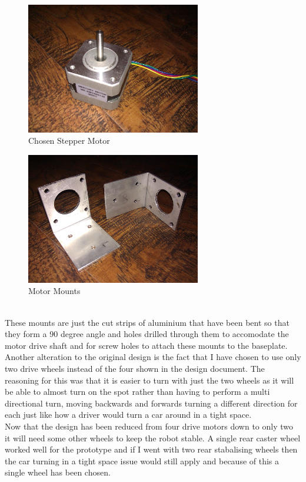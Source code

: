 \begin{figure}[h]
\centering
        \includegraphics[width=3.0in]  {Images/small-stepper.jpg}
        \caption{Chosen Stepper Motor}
        \label{Chosen Stepper Motor}
\end{figure}
\begin{figure}[h]
\centering
        \includegraphics[width=3.0in]  {Images/motor-mount-1.jpg}
        \caption{Motor Mounts}
        \label{Motor Mounts}
\end{figure}
\\These mounts are just the cut strips of aluminium that have been bent so that they form a 90 degree angle and holes drilled through them to accomodate the motor drive shaft and for screw holes to attach these mounts to the baseplate.
\\Another alteration to the original design is the fact that I have chosen to use only two drive wheels instead of the four shown in the design document.  The reasoning for this was that it is easier to turn with just the two wheels as it will be able to almost turn on the spot rather than having to perform a multi directional turn, moving backwards and forwards turning a different direction for each just like how a driver would turn a car around in a tight space.
\\Now that the design has been reduced from four drive motors down to only two it will need some other wheels to keep the robot stable.  A single rear caster wheel worked well for the prototype and if I went with two rear stabalising wheels then the car turning in a tight space issue would still apply and because of this a single wheel has been chosen.
